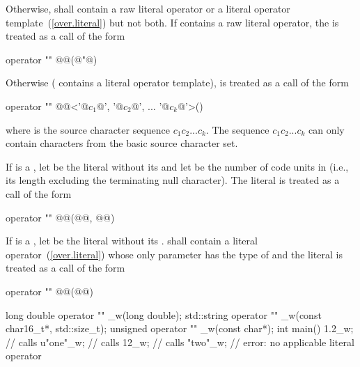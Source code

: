 Otherwise,  shall contain a raw literal operator or a literal operator
template~(\ref{over.literal}) but not both. If  contains a raw literal operator,
the   is treated as a call of the form

\begin{codeblock}
operator "" @@(@"@)
\end{codeblock}

Otherwise ( contains a literal operator template),  is treated as a call
of the form

\begin{codeblock}
operator "" @@<'@$c_1$@', '@$c_2$@', ... '@$c_k$@'>()
\end{codeblock}

where  is the source character sequence $c_1c_2...c_k$. \enternote The sequence
$c_1c_2...c_k$ can only contain characters from the basic source character set.
\exitnote

\pnum
If  is a , let  be the
literal without its  and let  be
the number of
code units in  (i.e., its length excluding the terminating
null character).
 The literal  is treated as a call of the form

\begin{codeblock}
operator "" @@(@@, @@)
\end{codeblock}

\pnum
If  is a , let  be the
literal without its .
 shall contain a literal operator~(\ref{over.literal}) whose only parameter has
the type of  and the
literal  is treated as a call
of the form

\begin{codeblock}
operator "" @@(@@)
\end{codeblock}

\pnum
\enterexample

\begin{codeblock}
long double operator "" _w(long double);
std::string operator "" _w(const char16_t*, std::size_t);
unsigned operator "" _w(const char*);
int main() {
  1.2_w;      // calls 
  u"one"_w;   // calls 
  12_w;       // calls 
  "two"_w;    // error: no applicable literal operator
}
\end{codeblock}

